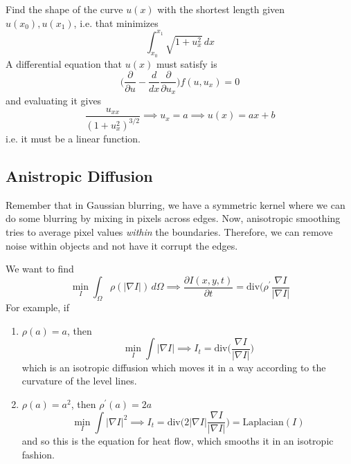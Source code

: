 \documentclass{article}
\begin{document}
    \begin{example}
      \label{ex:the-shortest-curve-between-two-points}
    Find the shape of the curve $u(x)$ with the shortest length given $u(x_0), u(x_1)$, i.e. that minimizes 
    \begin{equation}
      \int_{x_0}^{x_1} \sqrt{1 + u_x^2} \,dx
    \end{equation}
    A differential equation that $u(x)$ must satisfy is 
    \begin{equation}
      \bigg( \frac{\partial}{\partial u} - \frac{d}{dx} \frac{\partial}{\partial u_x} \bigg) f(u, u_x) = 0
    \end{equation}
    and evaluating it gives 
    \begin{equation}
      \frac{u_{xx}}{(1 + u_x^2)^{3/2}} \implies u_x = a \implies u(x) = ax + b
    \end{equation}
    i.e. it must be a linear function. 
    \end{example}

  \subsection{Anistropic Diffusion}

    Remember that in Gaussian blurring, we have a symmetric kernel where we can do some blurring by mixing in pixels across edges. Now, anisotropic smoothing tries to average pixel values \textit{within} the boundaries. Therefore, we can remove noise within objects and not have it corrupt the edges. 

    We want to find 
    \begin{equation}
      \min_I \int_\Omega \rho(| \nabla I|) \,d \Omega \implies \frac{\partial I(x, y, t)}{\partial t} = \mathrm{div} \bigg( \rho^\prime \frac{\nabla I}{|\nabla I|}
    \end{equation}
    For example, if 
    \begin{enumerate}
        \item $\rho(a) = a$, then 
        \begin{equation}
          \min_I \int |\nabla I| \implies I_t = \mathrm{div} \bigg( \frac{\nabla I}{|\nabla I|} \bigg)
        \end{equation}
        which is an isotropic diffusion which moves it in a way according to the curvature of the level lines. 

        \item $\rho(a) = a^2$, then $\rho^\prime(a) = 2a$
        \begin{equation}
          \min_I \int |\nabla I|^2 \implies I_t = \mathrm{div} \bigg( 2 |\nabla I| \frac{\nabla I}{|\nabla I|} \bigg) = \text{Laplacian}(I)
        \end{equation}
        and so this is the equation for heat flow, which smooths it in an isotropic fashion. 
    \end{enumerate}
\end{document}
